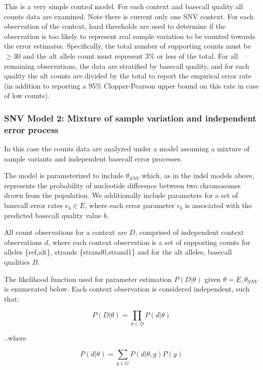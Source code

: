 \documentclass{article}
\begin{document}
This is a very simple control model. For each context and basecall quality all counts data are examined. Note there is current only one SNV context. For each observation of the context, hard thresholds are used to determine if the observation is too likely to represent real sample variation to be counted towards the error estimates. Specifically, the total number of supporting counts must be $\geq 30$ and the alt allele count must represent 3\% or less of the total. For all remaining observations, the data are stratified by basecall quality, and for each quality the alt counts are divided by the total to report the empirical error rate (in addition to reporting a 95\% Clopper-Pearson upper bound on this rate in case of low counts).

\subsubsection{SNV Model 2: Mixture of sample variation and independent error process}

In this case the counts data are analyzed under a model assuming a mixture of sample variants and independent basecall error processes.

The model is parameterized to include $\theta_{SNV}$ which, as in the indel models above, represents the probability of nucleotide difference between two chromosomes drawn from the population. We additionally include parameters for a set of basecall error rates $e_b \in E$, where each error parameter $e_b$ is associated with the predicted basecall quality value $b$.

All count observations for a context are $D$, comprised of independent context observations $d$, where each context observation is a set of supporting counts for alleles \{ref,alt\}, strands \{strand0,strand1\} and for the alt alleles, basecall qualities $B$.

The likelihood function used for parameter estimation $P( D \vert \theta )$ given $\theta = {E,\theta_{SNV}}$ is enumerated below. Each context observation is considered independent, such that:

\begin{equation}
\label{eq:snv_m2}
P(D \vert \theta) = \prod_{d \in D} P(d \vert \theta)
\end{equation}

..where

\begin{equation*}
P(d \vert \theta) = \sum_{g \in G} P(d \vert\theta, g) P(g)
\end{equation*}
\end{document}
